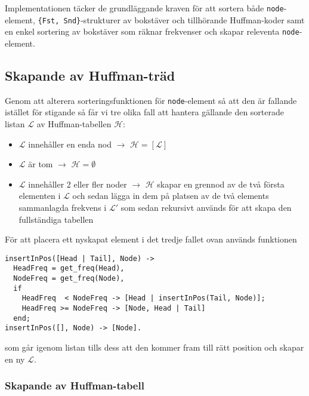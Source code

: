 \documentclass[a4paper, 11pt]{article}
\begin{document}
Implementationen täcker de grundläggande kraven för att sortera både \texttt{node}-element, \texttt{\{Fst, Snd\}}-strukturer av bokstäver och tillhörande Huffman-koder samt en enkel sortering av bokstäver som räknar frekvenser och skapar releventa \texttt{node}-element.

\subsection{Skapande av Huffman-träd}
Genom att alterera sorteringsfunktionen för \texttt{node}-element så att den är fallande istället för stigande så får vi tre olika fall att hantera gällande den sorterade listan $\mathcal{L}$ av Huffman-tabellen $\mathcal{H}$:

\begin{itemize}
\item $\mathcal{L}$ innehåller en enda nod $\rightarrow$ $\mathcal{H} = [\mathcal{L}]$
\item $\mathcal{L}$ är tom $\rightarrow$ $\mathcal{H} = \emptyset$
\item $\mathcal{L}$ innehåller 2 eller fler noder $\rightarrow$ $\mathcal{H}$ skapar en grennod av de två första elementen i $\mathcal{L}$ och sedan lägga in dem på platsen av de två elements sammanlagda frekvens i $\mathcal{L}'$ som sedan rekursivt används för att skapa den fullständiga tabellen
\end{itemize}

För att placera ett nyskapat element i det tredje fallet ovan används funktionen 

\begin{lstlisting}
insertInPos([Head | Tail], Node) ->                                             
  HeadFreq = get_freq(Head),                                                  
  NodeFreq = get_freq(Node),                                                  
  if                                                                          
    HeadFreq  < NodeFreq -> [Head | insertInPos(Tail, Node)];               
    HeadFreq >= NodeFreq -> [Node, Head | Tail]                             
  end;                                                                        
insertInPos([], Node) -> [Node].
\end{lstlisting}

som går igenom listan tills dess att den kommer fram till rätt position och skapar en ny $\mathcal{L}$.

\subsubsection{Skapande av Huffman-tabell}
\end{document}
